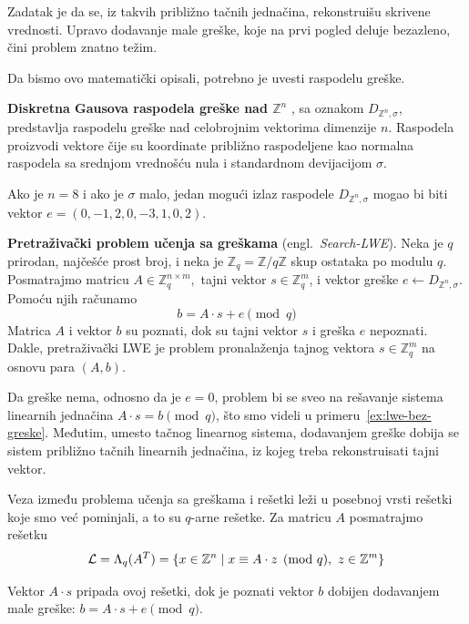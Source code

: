 Zadatak je da se, iz takvih približno tačnih jednačina, rekonstruišu skrivene vrednosti.
Upravo dodavanje male greške, koje na prvi pogled deluje bezazleno, čini problem znatno težim.

Da bismo ovo matematički opisali, potrebno je uvesti raspodelu greške.
\begin{definition}
    \textbf{Diskretna Gausova raspodela greške nad $\mathbb{Z}^n$ }, sa oznakom $D_{\mathbb{Z}^n,\sigma}$, predstavlja raspodelu greške nad
    celobrojnim vektorima dimenzije $n$. Raspodela proizvodi vektore čije su koordinate približno raspodeljene kao normalna raspodela sa srednjom vrednošću nula i standardnom devijacijom $\sigma$.
\end{definition}

\begin{example}
    Ako je $n=8$ i ako je $\sigma$ malo, jedan mogući izlaz raspodele $D_{\mathbb{Z}^n,\sigma}$ mogao bi biti vektor $e = (0,-1,2,0,-3,1,0,2).$
\end{example}

\begin{definition}
    \textbf{Pretraživački problem učenja sa greškama} (engl.\ \emph{Search-LWE}).
    Neka je $q$ prirodan, najčešće prost broj, i neka je $\mathbb{Z}_q = \mathbb{Z}/q\mathbb{Z}$ skup ostataka po modulu $q$.
    Posmatrajmo matricu $A \in \mathbb{Z}_q^{n \times m},$
    tajni vektor $s \in \mathbb{Z}_q^m$,
    i vektor greške $e \leftarrow D_{\mathbb{Z}^n,\sigma}$.
    Pomoću njih računamo \[ b = A \cdot s + e \pmod q \]
    Matrica $A$ i vektor $b$ su poznati,
    dok su tajni vektor $s$ i greška $e$ nepoznati.
    Dakle, pretraživački LWE je problem pronalaženja tajnog vektora $s \in \mathbb{Z}_q^m$ na osnovu para $(A,b)$.
\end{definition}

Da greške nema, odnosno da je $e=0$, problem bi se sveo na rešavanje sistema linearnih jednačina
$ A \cdot s = b \pmod q $, što smo videli u primeru~\ref{ex:lwe-bez-greske}.
Međutim, umesto tačnog linearnog sistema, dodavanjem greške dobija se sistem približno tačnih linearnih jednačina,
iz kojeg treba rekonstruisati tajni vektor.

Veza između problema učenja sa greškama i rešetki leži u posebnoj vrsti rešetki koje smo već pominjali, a to su $q$-arne rešetke.
Za matricu $A$ posmatrajmo rešetku
\[
    \mathcal{L} = \Lambda_q(A^T) =
    \{x \in \mathbb{Z}^n \mid x \equiv A \cdot z \pmod q,\ z \in \mathbb{Z}^m \}
\]

Vektor $A \cdot s$ pripada ovoj rešetki, dok je poznati vektor $b$ dobijen dodavanjem
male greške: $ b = A \cdot s + e \pmod q$.

